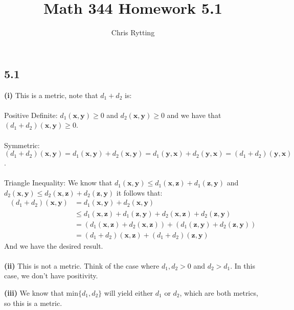 \documentclass[letterpaper,12pt]{article}
\theoremstyle{definition}
\begin{document}
\title{Math 344 Homework 5.1}
\author{Chris Rytting}
\maketitle

\subsection*{5.1}
\textbf{(i)}
This is a metric, note that $d_1 + d_2$ is:\\\\
Positive Definite: $d_1(\textbf{x}, \textbf{y}) \geq 0$ and $d_2(\textbf{x}, \textbf{y}) \geq 0$ and we have that $(d_1+d_2)(\textbf{x}, \textbf{y}) \geq 0$.\\\\

Symmetric: $(d_1+d_2)(\textbf{x}, \textbf{y}) = d_1(\textbf{x}, \textbf{y}) + d_2(\textbf{x}, \textbf{y}) = d_1(\textbf{y}, \textbf{x}) + d_2(\textbf{y}, \textbf{x}) = (d_1+d_2)(\textbf{y}, \textbf{x})$.  \\\\

Triangle Inequality: We know that $d_1(\textbf{x}, \textbf{y}) \leq d_1(\textbf{x}, \textbf{z}) + d_1(\textbf{z}, \textbf{y})$ and $d_2(\textbf{x}, \textbf{y}) \leq d_2(\textbf{x}, \textbf{z}) + d_2(\textbf{z}, \textbf{y})$ it follows that:
\begin{align*}
    (d_1 + d_2)(\textbf{x}, \textbf{y}) &= d_1(\textbf{x}, \textbf{y}) + d_2(\textbf{x}, \textbf{y}) \\
    & \leq d_1(\textbf{x}, \textbf{z}) + d_1(\textbf{z}, \textbf{y}) + d_2(\textbf{x}, \textbf{z}) + d_2(\textbf{z}, \textbf{y}) \\
    &= (d_1(\textbf{x}, \textbf{z}) + d_2(\textbf{x}, \textbf{z})) + (d_1(\textbf{z}, \textbf{y}) + d_2(\textbf{z}, \textbf{y})) \\
    &= (d_1 + d_2)(\textbf{x}, \textbf{z}) + (d_1 + d_2)(\textbf{z}, \textbf{y}) 
\end{align*}
And we have the desired result. \\\\

\textbf{(ii)}
This is not a metric. Think of the case where $d_1, d_2 > 0$ and $d_2 > d_1$. In this case, we don't have positivity.

\textbf{(iii)}
We know that $\text{min} \{d_1,d_2\} $ will yield either $d_1$ or $d_2$, which are both metrics, so this is a metric.
\end{document}
